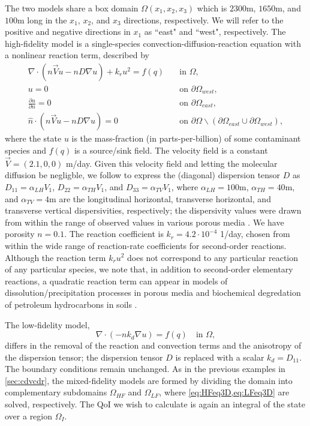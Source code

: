 The two models share a box domain $\Omega(x_1,x_2,x_3)$ which is $2300$m, $1650$m, and $100$m long in the $x_1$, $x_2$, and $x_3$ directions, respectively. We will refer to the positive and negative directions in $x_1$ as ``east" and ``west", respectively. The high-fidelity model is a single-species convection-diffusion-reaction equation with a nonlinear reaction term, described by
%
\begin{subequations}
\label{eq:cdvcdrHF3D}
\begin{align}
\nabla\cdot(n\vec{V}u - nD\nabla u) + k_ru^2 = f(q) \quad &\text{in } \Omega, \label{eq:HFeq3D}\\
u = 0 \quad &\text{on } \partial \Omega_{west}, \\
\frac{\partial u}{\partial n} = 0 \quad &\text{on }\partial\Omega_{east}, \\
\hat{n}\cdot(n\vec{V}u - nD\nabla u) = 0 \quad &\text{on }\partial\Omega\backslash(\partial\Omega_{east}\cup\partial\Omega_{west}),
\end{align} 
\end{subequations}
%
where the state $u$ is the mass-fraction (in parts-per-billion) of some contaminant species and $f(q)$ is a source/sink field. The velocity field is a constant $\vec{V}=(2.1,0,0)$ m/day. Given this velocity field and letting the molecular diffusion be negligble, we follow \cite{Vestedetal93} to express the (diagonal) dispersion tensor $D$ as $D_{11}=\alpha_{LH}V_1$, $D_{22}=\alpha_{TH}V_1$, and $D_{33}=\alpha_{TV}V_1$, where $\alpha_{LH}=100$m, $\alpha_{TH}=40$m, and $\alpha_{TV}=4$m are the longitudinal horizontal, transverse horizontal, and transverse vertical dispersivities, respectively; the dispersivity values were drawn from within the range of observed values in various porous media \cite{Davis86}. We have porosity $n=0.1$. The reaction coefficient is $k_r=4.2\cdot10^{-4}$ 1/day, chosen from within the wide range of reaction-rate coefficients for second-order reactions. Although the reaction term $k_ru^2$ does not correspond to any particular reaction of any particular species, we note that, in addition to second-order elementary reactions, a quadratic reaction term can appear in models of dissolution/precipitation processes in porous media \cite{Aha97} and biochemical degredation of petroleum hydrocarbons in soils \cite{Jack94}.

The low-fidelity model,
%
\begin{equation}
\nabla\cdot(- nk_d\nabla u) = f(q) \quad \text{in } \Omega, \label{eq:LFeq3D}
\end{equation}
%
differs in the removal of the reaction and convection terms and the anisotropy of the dispersion tensor; the dispersion tensor $D$ is replaced with a scalar $k_d=D_{11}$. The boundary conditions remain unchanged. As in the previous examples in \cref{sec:cdvcdr}, the mixed-fidelity models are formed by dividing the domain into complementary subdomains $\Omega_{HF}$ and $\Omega_{LF}$, where \cref{eq:HFeq3D,eq:LFeq3D} are solved, respectively. The QoI we wish to calculate is again an integral of the state over a region $\Omega_I$. 

